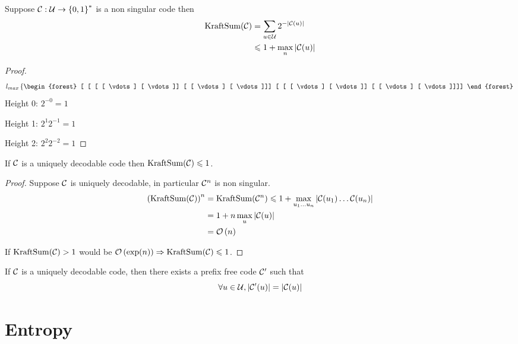 \begin{proposition}
    Suppose $\mathcal{C} : \mathcal{U} \to \left\{ 0,1 \right\}^*$ is a non singular code then
    \[
        \begin{aligned}
            \operatorname{KraftSum}(\mathcal{C}) &= \sum\limits_{u\in\mathcal{U}} 2^{-\left\lvert \mathcal{C}(u) \right\rvert}\\
            &\leqslant 1+ \max\limits_n \left\lvert \mathcal{C}(u)\right\rvert
        \end{aligned}
    \]
\end{proposition}
\begin{proof}
	\[
	    l_{max}
	    \left\lbrace
	    \begin{forest}
        	[  [  [  [ \vdots ] [ \vdots ]] [  [ \vdots ] [ \vdots ]]] [  [  [ \vdots ] [ \vdots ]] [  [ \vdots ] [ \vdots ]]]]
	    \end{forest}
	    \right.
    \]
    Height 0: $2^{-0} = 1$
    
    Height 1: $2^1 2^{-1} = 1$
    
    Height 2: $2^2 2^{-2} = 1$
\end{proof}

\begin{theorem}
    If $\mathcal{C}$ is a uniquely decodable code then $\operatorname{KraftSum}(\mathcal{C}) \leqslant 1$.
\end{theorem}
\begin{proof}
    Suppose $\mathcal{C}$ is uniquely decodable, in particular $\mathcal{C}^n$ is non singular.
    \[
        \begin{aligned}
            \left (\operatorname{KraftSum}(\mathcal{C})\right )^n &= \operatorname{KraftSum}(\mathcal{C}^n) \leqslant 1+\max\limits_{u_1\ldots u_n} \left \lvert \mathcal{C}(u_1)\ldots\mathcal{C}(u_n) \right \rvert\\
            &= 1 + n \max\limits_u \left \lvert \mathcal{C}(u) \right \rvert\\
            &= \mathcal O \left( n \right)
        \end{aligned}
    \]
    
    If $\operatorname{KraftSum}(\mathcal{C})>1$ would be $\mathcal O \left( \exp(n) \right) \Rightarrow \operatorname{KraftSum}(\mathcal{C})\leqslant 1$.
\end{proof}
\begin{corollary}
    If $\mathcal{C}$ is a uniquely decodable code, then there exists a prefix free code $\mathcal{C}'$ such that
    \[
        \forall u \in \mathcal{U}, \left\lvert \mathcal{C}'(u) \right\rvert = \left\lvert \mathcal{C}(u) \right\rvert    
    \]
\end{corollary}

\section{Entropy}

